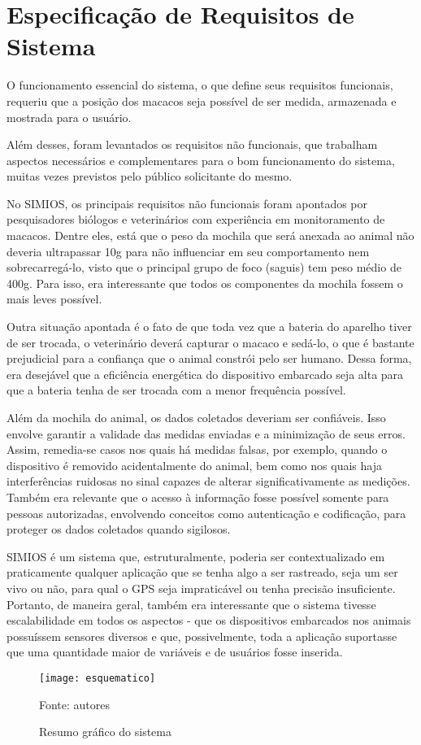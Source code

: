 \chapter{Especificação de Requisitos de Sistema}
O funcionamento essencial do sistema, o que define seus requisitos funcionais, requeriu que a posição dos macacos seja possível de ser medida, armazenada e mostrada para o usuário.

Além desses, foram levantados os requisitos não funcionais, que trabalham aspectos necessários e complementares para o bom funcionamento do sistema, muitas vezes previstos pelo público solicitante do mesmo.

No SIMIOS, os principais requisitos não funcionais foram apontados por pesquisadores biólogos e veterinários com experiência em monitoramento de macacos. Dentre eles, está que o peso da mochila que será anexada ao animal não deveria ultrapassar 10g para não influenciar em seu comportamento nem sobrecarregá-lo, visto que o principal grupo de foco (saguis) tem peso médio de 400g. Para isso, era interessante que todos os componentes da mochila fossem o mais leves possível.

Outra situação apontada é o fato de que toda vez que a bateria do aparelho tiver de ser trocada, o veterinário deverá capturar o macaco e sedá-lo, o que é bastante prejudicial para a confiança que o animal constrói pelo ser humano. Dessa forma, era desejável que a eficiência energética do dispositivo embarcado seja alta para que a bateria tenha de ser trocada com a menor frequência possível.

Além da mochila do animal, os dados coletados deveriam ser confiáveis. Isso envolve garantir a validade das medidas enviadas e a minimização de seus erros. Assim, remedia-se casos nos quais há medidas falsas, por exemplo, quando o dispositivo é removido acidentalmente do animal, bem como nos quais haja interferências ruidosas no sinal capazes de alterar significativamente as medições. Também era relevante que o acesso à informação fosse possível somente para pessoas autorizadas, envolvendo conceitos como autenticação e codificação, para proteger os dados coletados quando sigilosos.

SIMIOS é um sistema que, estruturalmente, poderia ser contextualizado em praticamente qualquer aplicação que se tenha algo a ser rastreado, seja um ser vivo ou não, para qual o GPS seja impraticável ou tenha precisão insuficiente. Portanto, de maneira geral, também era interessante que o sistema tivesse escalabilidade em todos os aspectos - que os dispositivos embarcados nos animais possuíssem sensores diversos e que, possivelmente, toda a aplicação suportasse que uma quantidade maior de variáveis e de usuários fosse inserida.

\begin{figure}[ht]
  \centering
  \caption{Resumo gráfico do sistema}
    \texttt{[image: esquematico]}
  \centerline{\small{Fonte: autores}}
\end{figure}
\FloatBarrier
